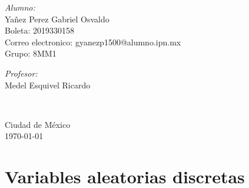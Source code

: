 \documentclass[10pt]{article}\usepackage[]{graphicx}\usepackage[]{color}
\begin{document}
\begin{center}
\begin{minipage}{0.46\textwidth}
\begin{flushleft}
\emph{Alumno:}\\	
Yañez Perez Gabriel Osvaldo\\
Boleta: 2019330158\\
Correo electronico: gyanezp1500@alumno.ipn.mx\\
Grupo: 8MM1
\end{flushleft}																		%
\end{minipage}		
\begin{minipage}{0.52\textwidth}		
\vspace{-0.6cm}											%
\begin{flushright} \large															%
\emph{Profesor:} \\																	%
Medel Esquivel Ricardo\\
\end{flushright}																	%
\end{minipage}	
\vspace*{1cm}
 	
 		\\																		%
\vspace{2cm} 																				
\begin{center}	
Ciudad de México  \\
{\large \today}																	%
 			\end{center}												  						
\end{center}							 											
																					
\newpage																			

\tableofcontents 
\newpage

\section{Variables aleatorias discretas}
\end{document}
